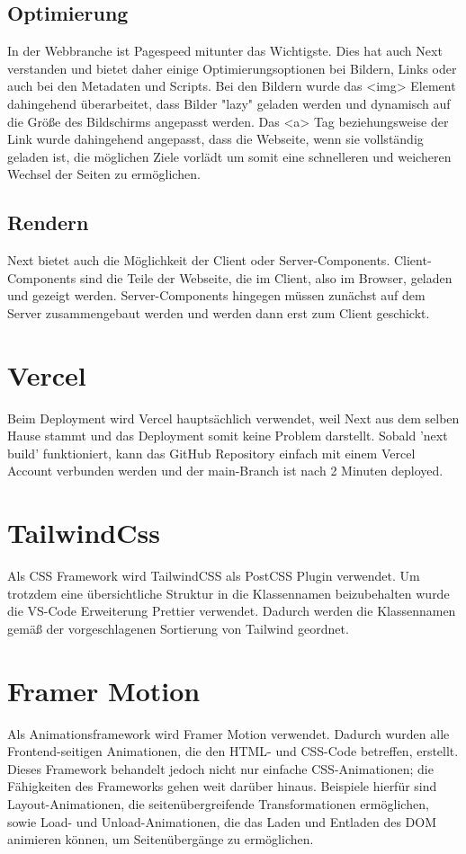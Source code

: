 \subsection{Optimierung}
In der Webbranche ist Pagespeed mitunter das Wichtigste. Dies hat auch Next verstanden und bietet daher einige Optimierungsoptionen bei Bildern, Links oder auch bei den Metadaten und Scripts. 
Bei den Bildern wurde das <img> Element dahingehend überarbeitet, dass Bilder "lazy" geladen werden und dynamisch auf die Größe des Bildschirms angepasst werden. 
Das <a> Tag beziehungsweise der Link wurde dahingehend angepasst, dass die Webseite, wenn sie vollständig geladen ist, die möglichen Ziele vorlädt um somit eine schnelleren und weicheren Wechsel der Seiten zu ermöglichen. \cite{nextjsdocsoptimizations}

\subsection{Rendern}
Next bietet auch die Möglichkeit der Client oder Server-Components. Client-Components sind die Teile der Webseite, die im Client, also im Browser, geladen und gezeigt werden.
Server-Components hingegen müssen zunächst auf dem Server zusammengebaut werden und werden dann erst zum Client geschickt. \cite{nextjsdocsrendering}

\section{Vercel}
Beim Deployment wird Vercel hauptsächlich verwendet, weil Next aus dem selben Hause stammt und das Deployment somit keine Problem darstellt.
Sobald 'next build' funktioniert, kann das GitHub Repository einfach mit einem Vercel Account verbunden werden und der main-Branch ist nach 2 Minuten deployed. \cite{vercel}

\section{TailwindCss}
Als CSS Framework wird TailwindCSS als PostCSS Plugin verwendet. 
Um trotzdem eine übersichtliche Struktur in die Klassennamen beizubehalten wurde die VS-Code Erweiterung Prettier verwendet. 
Dadurch werden die Klassennamen gemäß der vorgeschlagenen Sortierung von Tailwind geordnet.


\section{Framer Motion}
Als Animationsframework wird Framer Motion verwendet.
Dadurch wurden alle Frontend-seitigen Animationen, die den HTML- und CSS-Code betreffen, erstellt. Dieses Framework behandelt jedoch nicht nur einfache CSS-Animationen; die Fähigkeiten des Frameworks gehen weit darüber hinaus. Beispiele hierfür sind Layout-Animationen, die seitenübergreifende Transformationen ermöglichen, sowie Load- und Unload-Animationen, die das Laden und Entladen des DOM animieren können, um Seitenübergänge zu ermöglichen.

